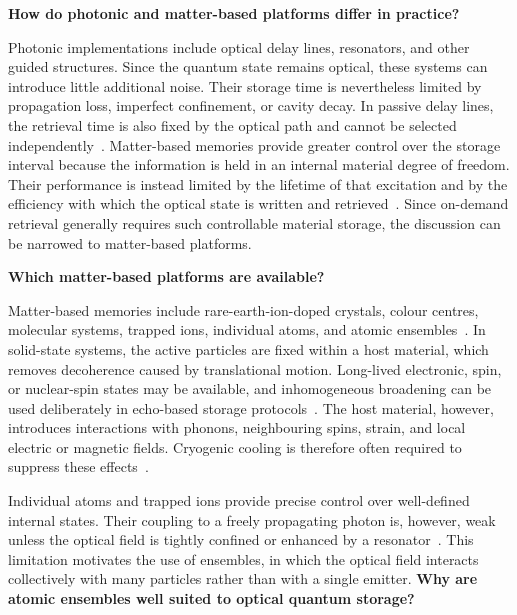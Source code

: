 \noindent\textbf{How do photonic and matter-based platforms differ in practice?}

Photonic implementations include optical delay lines, resonators, and other guided structures. Since the quantum state remains optical, these systems can introduce little additional noise. Their storage time is nevertheless limited by propagation loss, imperfect confinement, or cavity decay. In passive delay lines, the retrieval time is also fixed by the optical path and cannot be selected independently~\cite{Oqm_LvovskyEtAl_2009,Qmeaara_HeshamiEtAl_2016}. Matter-based memories provide greater control over the storage interval because the information is held in an internal material degree of freedom. Their performance is instead limited by the lifetime of that excitation and by the efficiency with which the optical state is written and retrieved~\cite{Qmeaara_HeshamiEtAl_2016,Oqm_LvovskyEtAl_2009}. Since on-demand retrieval generally requires such controllable material storage, the discussion can be narrowed to matter-based platforms.

\noindent\textbf{Which matter-based platforms are available?}

Matter-based memories include rare-earth-ion-doped crystals, colour centres, molecular systems, trapped ions, individual atoms, and atomic ensembles~\cite{Qmeaara_HeshamiEtAl_2016}. In solid-state systems, the active particles are fixed within a host material, which removes decoherence caused by translational motion. Long-lived electronic, spin, or nuclear-spin states may be available, and inhomogeneous broadening can be used deliberately in echo-based storage protocols~\cite{Qmeaara_HeshamiEtAl_2016,Oqm_LvovskyEtAl_2009}. The host material, however, introduces interactions with phonons, neighbouring spins, strain, and local electric or magnetic fields. Cryogenic cooling is therefore often required to suppress these effects~\cite{Qmeaara_HeshamiEtAl_2016,Oqm_LvovskyEtAl_2009}.

Individual atoms and trapped ions provide precise control over well-defined internal states. Their coupling to a freely propagating photon is, however, weak unless the optical field is tightly confined or enhanced by a resonator~\cite{Qmeaara_HeshamiEtAl_2016}. This limitation motivates the use of ensembles, in which the optical field interacts collectively with many particles rather than with a single emitter.
\noindent\textbf{Why are atomic ensembles well suited to optical quantum storage?}

